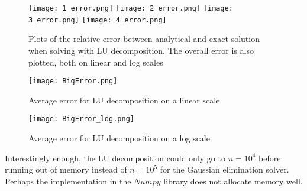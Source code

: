 \documentclass[12pt]{article}
\begin{document}
\begin{figure}[H]
\centering
\graphicspath{ {c:/Users/charl/Documents/Precision/LU/}{C:/Users/Mike/Documents/GitHub/sayboltm/PHY480/Project1/Report/Precision/LU/}}
\texttt{[image: 1\_error.png]}
\texttt{[image: 2\_error.png]}
\texttt{[image: 3\_error.png]}
\texttt{[image: 4\_error.png]}\\
\centering
\caption{ Plots of the relative error between analytical and exact solution when solving with LU decomposition.	The overall error is also plotted, both on linear and log scales}
\end{figure}

\begin{figure}[H]
\centering
\graphicspath{ {c:/Users/charl/Documents/Precision/LU/}{C:/Users/Mike/Documents/GitHub/sayboltm/PHY480/Project1/Report/Precision/LU/}}
\texttt{[image: BigError.png]}
\caption{Average error for LU decomposition on a linear scale}
\end{figure}

\begin{figure}[H]
\centering
\graphicspath{ {c:/Users/charl/Documents/Precision/LU/}{C:/Users/Mike/Documents/GitHub/sayboltm/PHY480/Project1/Report/Precision/LU/}}
\texttt{[image: BigError\_log.png]}
\caption{Average error for LU decomposition on a log scale}
\end{figure}

Interestingly enough, the LU decomposition could only go to $n=10^4$ before running out of memory instead of $n=10^5$ for the Gaussian elimination solver. Perhaps the implementation in the $Numpy$ library does not allocate memory well.
\end{document}
